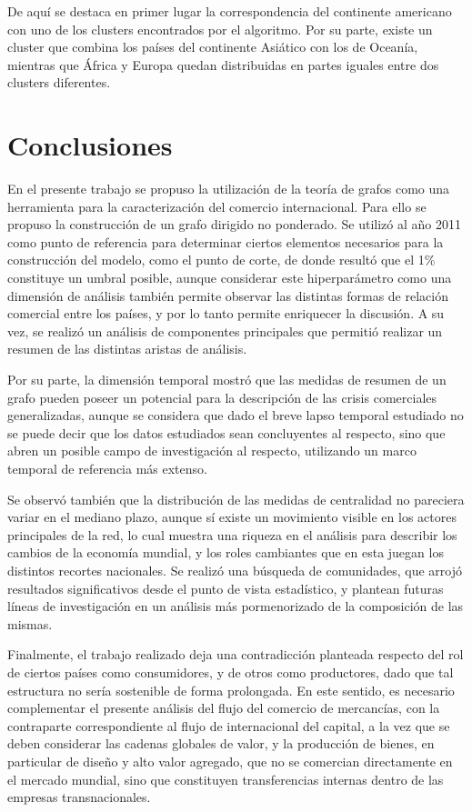 \documentclass[runningheads,a4paper]{llncs}
\begin{document}
De aquí se destaca en primer lugar la correspondencia del continente americano con uno de los clusters encontrados por el algoritmo. Por su parte, existe un cluster que combina los países del continente Asiático con los de Oceanía, mientras que África y Europa quedan distribuidas en partes iguales entre dos clusters diferentes. 

\section{Conclusiones}

En el presente trabajo se propuso la utilización de la teoría de grafos como una herramienta para la caracterización del comercio internacional. Para ello se propuso la construcción de un grafo dirigido no ponderado.  Se utilizó al año 2011 como punto de referencia para determinar ciertos elementos necesarios para la construcción del modelo, como el punto de corte, de donde resultó que el 1\% constituye un umbral posible, aunque considerar este hiperparámetro como una dimensión de análisis también permite observar las distintas formas de relación comercial entre los países, y por lo tanto permite enriquecer la discusión. A su vez, se realizó un análisis de componentes principales que permitió realizar un resumen de las distintas aristas de análisis.

Por su parte, la dimensión temporal mostró que las medidas de resumen de un grafo pueden poseer un potencial para la descripción de las crisis comerciales generalizadas, aunque se considera que dado el breve lapso temporal estudiado no se puede decir que los datos estudiados sean concluyentes al respecto, sino que abren un posible campo de investigación al respecto, utilizando un marco temporal de referencia más extenso.                    

Se observó también que la distribución de las medidas de centralidad no pareciera variar en el mediano plazo, aunque sí existe un movimiento visible en los actores principales de la red, lo cual muestra una riqueza en el análisis para describir los cambios de la economía mundial, y los roles cambiantes que en esta juegan los distintos recortes nacionales. 
Se realizó una búsqueda de comunidades, que arrojó resultados significativos desde el punto de vista estadístico, y plantean futuras líneas de investigación en un análisis más pormenorizado de la composición de las mismas.                      

Finalmente, el trabajo realizado deja una contradicción planteada respecto del rol de ciertos países como consumidores, y de otros como productores, dado que tal estructura no sería sostenible de forma prolongada. En este sentido, es necesario complementar el presente análisis del flujo del comercio de mercancías, con la contraparte correspondiente al flujo de internacional del capital, a la vez que se deben considerar las cadenas globales de valor, y la producción de bienes, en particular de diseño y alto valor agregado, que no se comercian directamente en el mercado mundial, sino que constituyen transferencias internas dentro de las empresas transnacionales.




\end{document}
